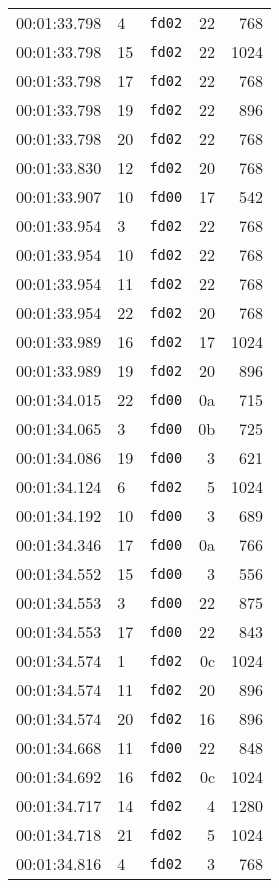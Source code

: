 \documentclass{article}
\begin{document}
\begin{longtable}{lllrr}
00:01:33.798 & 4 & \texttt{fd02} & 22 & 768 \\
00:01:33.798 & 15 & \texttt{fd02} & 22 & 1024 \\
00:01:33.798 & 17 & \texttt{fd02} & 22 & 768 \\
00:01:33.798 & 19 & \texttt{fd02} & 22 & 896 \\
00:01:33.798 & 20 & \texttt{fd02} & 22 & 768 \\
00:01:33.830 & 12 & \texttt{fd02} & 20 & 768 \\
00:01:33.907 & 10 & \texttt{fd00} & 17 & 542 \\
00:01:33.954 & 3 & \texttt{fd02} & 22 & 768 \\
00:01:33.954 & 10 & \texttt{fd02} & 22 & 768 \\
00:01:33.954 & 11 & \texttt{fd02} & 22 & 768 \\
00:01:33.954 & 22 & \texttt{fd02} & 20 & 768 \\
00:01:33.989 & 16 & \texttt{fd02} & 17 & 1024 \\
00:01:33.989 & 19 & \texttt{fd02} & 20 & 896 \\
00:01:34.015 & 22 & \texttt{fd00} & 0a & 715 \\
00:01:34.065 & 3 & \texttt{fd00} & 0b & 725 \\
00:01:34.086 & 19 & \texttt{fd00} & 3 & 621 \\
00:01:34.124 & 6 & \texttt{fd02} & 5 & 1024 \\
00:01:34.192 & 10 & \texttt{fd00} & 3 & 689 \\
00:01:34.346 & 17 & \texttt{fd00} & 0a & 766 \\
00:01:34.552 & 15 & \texttt{fd00} & 3 & 556 \\
00:01:34.553 & 3 & \texttt{fd00} & 22 & 875 \\
00:01:34.553 & 17 & \texttt{fd00} & 22 & 843 \\
00:01:34.574 & 1 & \texttt{fd02} & 0c & 1024 \\
00:01:34.574 & 11 & \texttt{fd02} & 20 & 896 \\
00:01:34.574 & 20 & \texttt{fd02} & 16 & 896 \\
00:01:34.668 & 11 & \texttt{fd00} & 22 & 848 \\
00:01:34.692 & 16 & \texttt{fd02} & 0c & 1024 \\
00:01:34.717 & 14 & \texttt{fd02} & 4 & 1280 \\
00:01:34.718 & 21 & \texttt{fd02} & 5 & 1024 \\
00:01:34.816 & 4 & \texttt{fd02} & 3 & 768 \\

\end{longtable}
\end{document}
